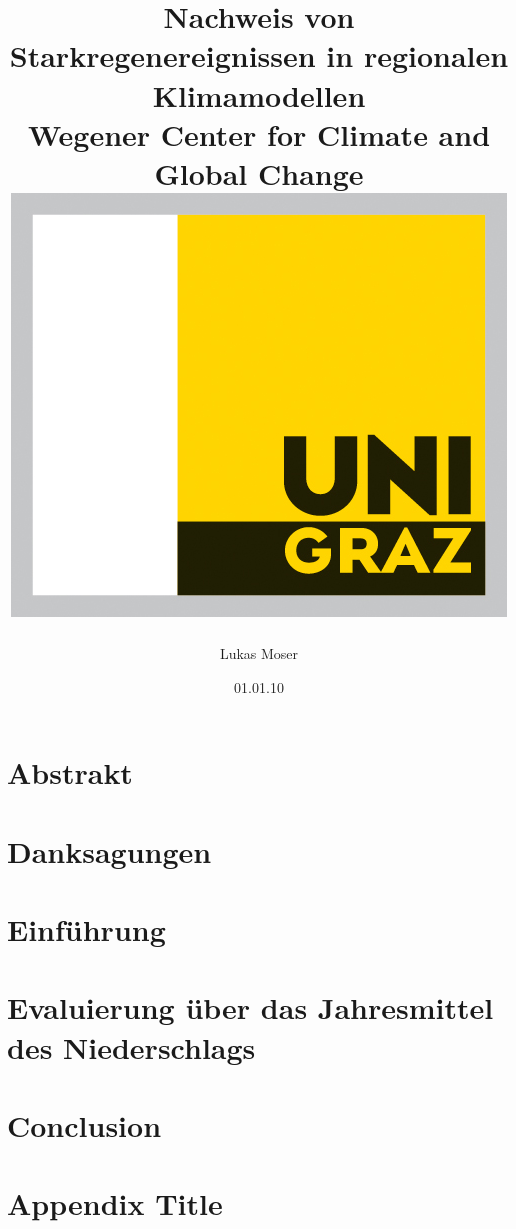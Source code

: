 \documentclass[12pt,twoside]{report}
\title{
	{Nachweis von Starkregenereignissen in regionalen Klimamodellen}\\
	{\large Wegener Center for Climate and Global Change}\\
	{\includegraphics{university.jpg}}
}
\author{Lukas Moser}
\date{01.01.10}
\begin{document}
	\maketitle
	\pagestyle{fancy}
	\chapter*{Abstrakt}
	
	\chapter*{Danksagungen}
	
	\tableofcontents
	
	\chapter{Einführung}
	

	\chapter{Evaluierung über das Jahresmittel des Niederschlags}
	
	
	
	\chapter{Conclusion}
	
	
	\appendix
	\chapter{Appendix Title}
	
	
\end{document}
